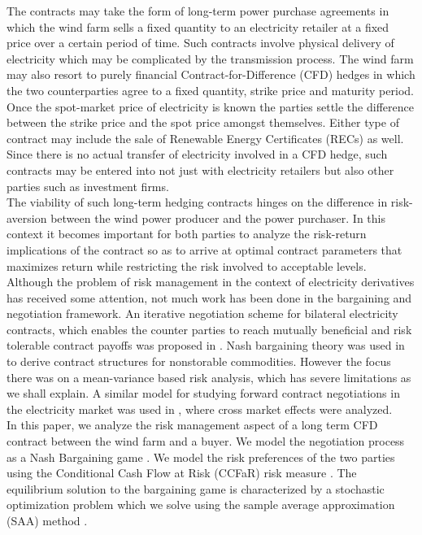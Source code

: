 \noindent The contracts may take the form of long-term power purchase agreements in which the wind farm sells a fixed quantity to an electricity retailer at a fixed price over a certain period of time. Such contracts involve physical delivery of electricity which may be complicated by the transmission process. The wind farm may also resort to purely financial Contract-for-Difference (CFD) hedges in which the two counterparties agree to a fixed quantity, strike price and maturity period. Once the spot-market price of electricity is known the parties settle the difference between the strike price and the spot price amongst themselves. Either type of contract may include the sale of Renewable Energy Certificates (RECs) as well. Since there is no actual transfer of electricity involved in a CFD hedge, such contracts may be entered into not just with electricity retailers but also other parties such as investment firms.\\

\noindent The viability of such long-term hedging contracts hinges on the difference in risk-aversion between the wind power producer and the power purchaser. In this context it becomes important for both parties to analyze the risk-return implications of the contract so as to arrive at optimal contract parameters that maximizes return while restricting the risk involved to acceptable levels.\\

\noindent Although the problem of risk management in the context of electricity derivatives has received some attention, not much work has been done in the bargaining and negotiation framework. An iterative negotiation scheme for bilateral electricity contracts, which enables the counter parties to reach mutually beneficial and risk tolerable contract payoffs was proposed in \cite{4162589}. Nash bargaining theory was used in \cite{dong_equilibrium_2007} to derive contract structures for nonstorable commodities. However the focus there was on a mean-variance based risk analysis, which has severe limitations as we shall explain. A similar model for studying forward contract negotiations in the electricity market was used in \cite{RePEc:isu:genres:32005}, where cross market effects were analyzed. \\

\noindent In this paper, we analyze the risk management aspect of a long term CFD contract between the wind farm and a buyer. We model the negotiation process as a Nash Bargaining game \cite{nash_bargaining_1950}. We model the risk preferences of the two parties using the Conditional Cash Flow at Risk (CCFaR) risk measure \cite{rockafellar_optimization_2000, prokopczuk_quantifying_2007}. The equilibrium solution to the bargaining game is characterized by a stochastic optimization problem which we solve using the sample average approximation (SAA) method \cite{kleywegt_sample_2002, shapiro_lectures_2009}.\\

